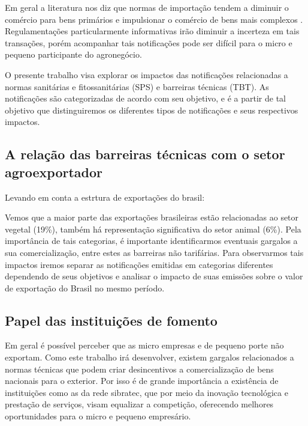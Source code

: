 \documentclass[12pt, a4paper]{article}
\begin{document}
Em geral a literatura  nos diz que normas de importação tendem a diminuir o comércio para bens primários e impulsionar o comércio de bens mais complexos \cite{moenius}. Regulamentações particularmente informativas irão diminuir a incerteza em tais transações, porém acompanhar tais notificações pode ser difícil para o micro e pequeno participante do agronegócio. 

O presente trabalho visa explorar os impactos das notificações relacionadas a normas sanitárias e fitossanitárias  (SPS) e barreiras técnicas  (TBT). As notificações são categorizadas de acordo com seu objetivo, e é a partir de tal objetivo que distinguiremos os diferentes tipos de notificações e seus respectivos impactos.

\subsection{A relação das barreiras técnicas com o setor agroexportador}

Levando em conta a estrtura de exportações do brasil:



Vemos que a maior parte das exportações brasileiras estão relacionadas ao setor vegetal (19\%), também há representação significativa do setor animal (6\%). Pela importância de tais categorias, é importante identificarmos eventuais gargalos a sua comercialização, entre estes as barreiras não tarifárias. Para observarmos  tais impactos iremos separar as notificações emitidas em categorias diferentes dependendo de seus objetivos e analisar o impacto de suas emissões sobre o valor de exportação do Brasil no mesmo período.


\subsection{Papel das instituições de fomento}



Em geral é possível perceber que as micro empresas e de pequeno porte não exportam. Como este trabalho irá desenvolver, existem gargalos relacionados a normas técnicas que podem criar desincentivos a comercialização de bens nacionais para o exterior. Por isso é de grande importância a existência de instituições como as da rede sibratec, que por meio da inovação tecnológica e prestação de serviços, visam equalizar a competição, oferecendo melhores oportunidades para o micro e pequeno empresário.
\end{document}
